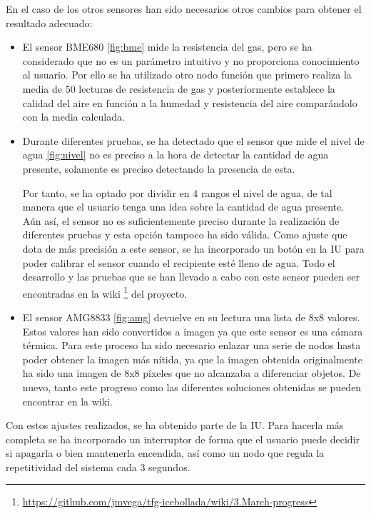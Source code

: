 En el caso de los otros sensores han sido necesarios otros cambios para obtener el resultado adecuado:
\begin{itemize}
	\item El sensor BME680 \ref{fig:bme} mide la resistencia del gas, pero se ha considerado que no es un parámetro intuitivo y no proporciona conocimiento al usuario. Por ello se ha utilizado otro nodo función que primero realiza la media de 50 lecturas de resistencia de gas y posteriormente establece la calidad del aire en función a la humedad y resistencia del aire comparándolo con la media calculada.
	
	\item Durante diferentes pruebas, se ha detectado que el sensor que mide el nivel de agua \ref{fig:nivel} no es preciso a la hora de detectar la cantidad de agua presente, solamente es preciso detectando la presencia de esta.
	
	Por tanto, se ha optado por dividir en 4 rangos el nivel de agua, de tal manera que el usuario tenga una idea sobre la cantidad de agua presente. Aún así, el sensor no es suficientemente preciso durante la realización de diferentes pruebas y esta opción tampoco ha sido válida. 
	Como ajuste que dota de más precisión a este sensor, se ha incorporado un botón en la IU para poder calibrar el sensor cuando el recipiente esté lleno de agua. Todo el desarrollo y las pruebas que se han llevado a cabo con este sensor pueden ser encontradas en la wiki \footnote{\url{https://github.com/jmvega/tfg-icebollada/wiki/3.March-progress}} del proyecto.
	
	\item El sensor AMG8833 \ref{fig:amg} devuelve en su lectura una lista de 8x8 valores. Estos valores han sido convertidos a imagen ya que este sensor es una cámara térmica. Para este proceso ha sido necesario enlazar una serie de nodos hasta poder obtener la imagen más nítida, ya que la imagen obtenida originalmente ha sido una imagen de 8x8 píxeles que no alcanzaba a diferenciar objetos. De nuevo, tanto este progreso como las diferentes soluciones obtenidas se pueden encontrar en la wiki. 
\end{itemize}

Con estos ajustes realizados, se ha obtenido parte de la IU. Para hacerla más completa se ha incorporado un interruptor de forma que el usuario puede decidir si apagarla o bien mantenerla encendida, así como un nodo que regula la repetitividad del sistema cada 3 segundos.

